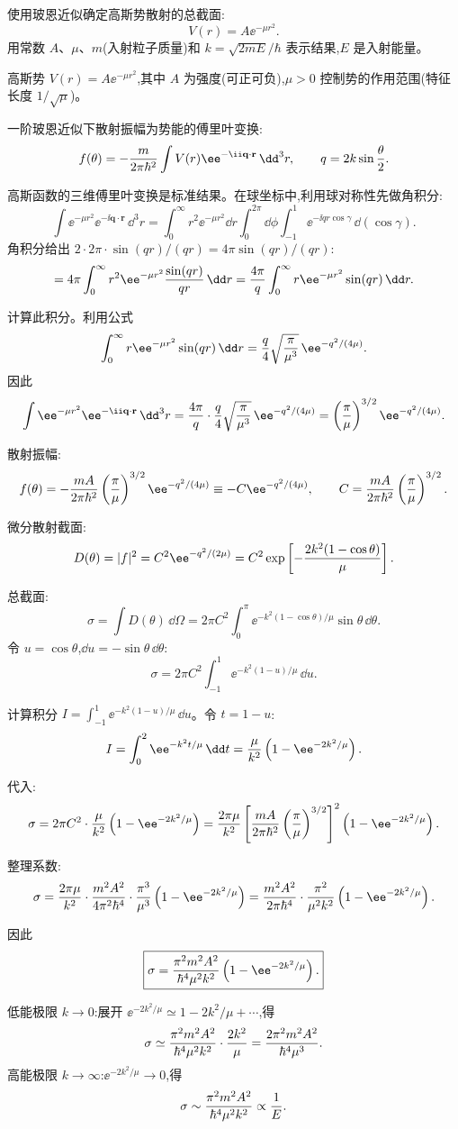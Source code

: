\begin{question}
使用玻恩近似确定高斯势散射的总截面:
\[
V(r)=A\ee^{-\mu r^2}.
\]
用常数 $A$、$\mu$、$m$(入射粒子质量)和 $k=\sqrt{2mE}/\hbar$ 表示结果,$E$ 是入射能量。
\end{question}
\begin{solution}
高斯势 $V(r)=A\ee^{-\mu r^2}$,其中 $A$ 为强度(可正可负),$\mu>0$ 控制势的作用范围(特征长度 $1/\sqrt{\mu}$)。

一阶玻恩近似下散射振幅为势能的傅里叶变换:
\[
f(\theta)=-{m\over2\pi\hbar^2}\int V(r)\ee^{-\ii\mathbf q\cdot\mathbf r}\,\dd^3r,
\qquad q=2k\sin{\theta\over2}.
\]

高斯函数的三维傅里叶变换是标准结果。在球坐标中,利用球对称性先做角积分:
\[
\int \ee^{-\mu r^2}\ee^{-\ii\mathbf q\cdot\mathbf r}\,\dd^3r
=\int_0^\infty r^2\ee^{-\mu r^2}\dd r\int_0^{2\pi}\dd\phi\int_{-1}^{1}\ee^{-\ii qr\cos\gamma}\,\dd(\cos\gamma).
\]
角积分给出 $2\cdot{2\pi}\cdot{\sin(qr)/(qr)}=4\pi\sin(qr)/(qr)$:
\[
=4\pi\int_0^\infty r^2\ee^{-\mu r^2}{\sin(qr)\over qr}\,\dd r
={4\pi\over q}\int_0^\infty r \ee^{-\mu r^2}\sin(qr)\,\dd r.
\]

计算此积分。利用公式
\[
\int_0^\infty r \ee^{-\mu r^2}\sin(qr)\,\dd r={q\over4}\sqrt{\pi\over\mu^3}\,\ee^{-q^2/(4\mu)}.
\]
因此
\[
\int \ee^{-\mu r^2}\ee^{-\ii\mathbf q\cdot\mathbf r}\,\dd^3r
={4\pi\over q}\cdot{q\over4}\sqrt{\pi\over\mu^3}\,\ee^{-q^2/(4\mu)}
=\left({\pi\over\mu}\right)^{3/2}\ee^{-q^2/(4\mu)}.
\]

散射振幅:
\[
f(\theta)=-{mA\over2\pi\hbar^2}\left({\pi\over\mu}\right)^{3/2}\ee^{-q^2/(4\mu)}
\equiv-C\ee^{-q^2/(4\mu)},
\qquad C={mA\over2\pi\hbar^2}\left({\pi\over\mu}\right)^{3/2}.
\]

微分散射截面:
\[
D(\theta)=|f|^2=C^2\ee^{-q^2/(2\mu)}=C^2\exp\left[-{2k^2(1-\cos\theta)\over\mu}\right].
\]

总截面:
\[
\sigma=\int D(\theta)\,\dd\Omega
=2\pi C^2\int_{0}^{\pi}\ee^{-k^2(1-\cos\theta)/\mu}\sin\theta\,\dd\theta.
\]
令 $u=\cos\theta$,$\dd u=-\sin\theta\,\dd\theta$:
\[
\sigma=2\pi C^2\int_{-1}^{1}\ee^{-k^2(1-u)/\mu}\,\dd u.
\]

计算积分 $\displaystyle I=\int_{-1}^{1}\ee^{-k^2(1-u)/\mu}\,\dd u$。令 $t=1-u$:
\[
I=\int_{0}^{2}\ee^{-k^2t/\mu}\,\dd t
={\mu\over k^2}\left(1-\ee^{-2k^2/\mu}\right).
\]

代入:
\[
\sigma=2\pi C^2\cdot{\mu\over k^2}\left(1-\ee^{-2k^2/\mu}\right)
={2\pi\mu\over k^2}\left[{mA\over2\pi\hbar^2}\left({\pi\over\mu}\right)^{3/2}\right]^2\left(1-\ee^{-2k^2/\mu}\right).
\]

整理系数:
\[
\sigma={2\pi\mu\over k^2}\cdot{m^2A^2\over4\pi^2\hbar^4}\cdot{\pi^3\over\mu^3}\left(1-\ee^{-2k^2/\mu}\right)
={m^2A^2\over2\pi\hbar^4}\cdot{\pi^2\over\mu^2k^2}\left(1-\ee^{-2k^2/\mu}\right).
\]

因此
\[
\boxed{\sigma={\pi^2 m^2 A^2\over\hbar^4\mu^2k^2}\left(1-\ee^{-2k^2/\mu}\right).}
\]

低能极限 $k\to0$:展开 $\ee^{-2k^2/\mu}\simeq 1-2k^2/\mu+\cdots$,得
\[
\sigma\simeq{\pi^2 m^2 A^2\over\hbar^4\mu^2k^2}\cdot{2k^2\over\mu}
={2\pi^2 m^2 A^2\over\hbar^4\mu^3}.
\]
高能极限 $k\to\infty$:$\ee^{-2k^2/\mu}\to0$,得
\[
\sigma\sim{\pi^2 m^2 A^2\over\hbar^4\mu^2k^2}\propto{1\over E}.
\]
\end{solution}

